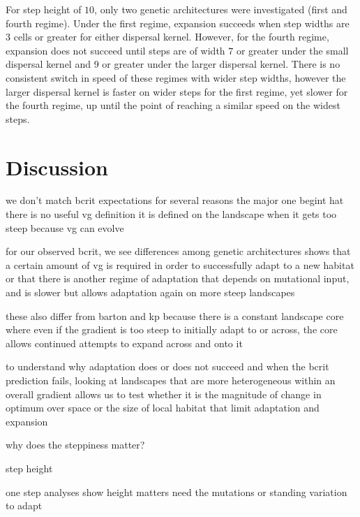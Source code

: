 For step height of $10$, only two genetic architectures were investigated (first and fourth regime). Under the first regime, expansion succeeds when step widths are $3$ cells or greater for either dispersal kernel. However, for the fourth regime, expansion does not succeed until steps are of width $7$ or greater under the small dispersal kernel and 9 or greater under the larger dispersal kernel. There is no consistent switch in speed of these regimes with wider step widths, however the larger dispersal kernel is faster on wider steps for the first regime, yet slower for the fourth regime, up until the point of reaching a similar speed on the widest steps.



\section{Discussion}

we don't match bcrit expectations for several reasons
the major one begint hat there is no useful vg definition
it is defined on the landscape when it gets too steep
because vg can evolve

for our observed bcrit, we see differences among genetic architectures
shows that a certain amount of vg is required in order to successfully adapt to a new habitat
or that there is another regime of adaptation that depends on mutational input, and is slower but allows adaptation again on more steep landscapes

these also differ from barton and kp because there is a constant landscape core where even if the gradient is too steep to initially adapt to or across, the core allows continued attempts to expand across and onto it



to understand why adaptation does or does not succeed and when the bcrit prediction fails, looking at landscapes that are more heterogeneous within an overall gradient allows us to test whether it is the magnitude of change in optimum over space or the size of local habitat that limit adaptation and expansion




why does the steppiness matter?

step height

	one step analyses show height matters
	need the mutations or standing variation to adapt


